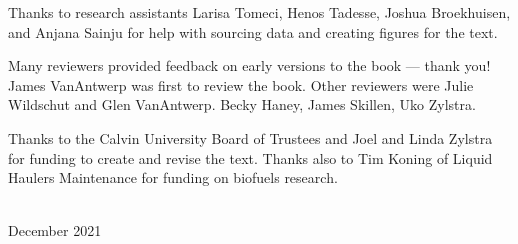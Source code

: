 Thanks to research assistants Larisa Tomeci, Henos Tadesse, Joshua Broekhuisen,
and Anjana Sainju for help with sourcing data and creating figures for the text. 

Many reviewers provided feedback on early versions to the book --- thank you!
James VanAntwerp was first to review the book. %
Other reviewers were Julie Wildschut and Glen VanAntwerp. Becky Haney, James Skillen, Uko Zylstra.


Thanks to the Calvin University Board of Trustees and Joel and Linda Zylstra
for funding to create and revise the text.
Thanks also to Tim Koning of Liquid Haulers Maintenance for funding on biofuels research.



\vspace*{2pc}
\noindent\AUTHORS\\
\noindent December 2021
 
\clearpage

\blankpage

